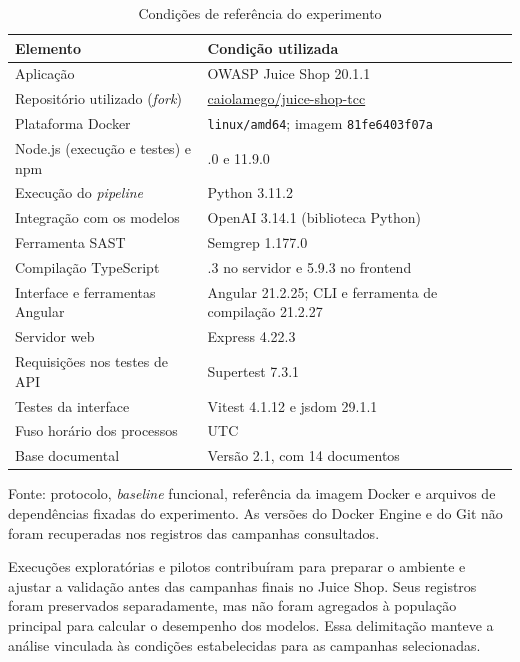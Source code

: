 \begin{table}[H]
\centering
\caption{Condições de referência do experimento}
\label{tab:condicoes}
\renewcommand{\arraystretch}{1.35}
\begin{tabularx}{\textwidth}{|>{\raggedright\arraybackslash}p{}|>{\raggedright\arraybackslash}X|}
\hline
\textbf{Elemento} & \textbf{Condição utilizada} \\
\hline
Aplicação & OWASP Juice Shop 20.1.1 \\
\hline
Repositório utilizado (\textit{fork}) & \href{https://github.com/caiolamego/juice-shop-tcc}{caiolamego/juice-shop-tcc} \\
\hline
Plataforma Docker & \texttt{linux/amd64}; imagem \texttt{81fe6403f07a} \\
\hline
Node.js (execução e testes) e npm & 24.14.0 e 11.9.0 \\
\hline
Execução do \textit{pipeline} & Python 3.11.2 \\
\hline
Integração com os modelos & OpenAI 3.14.1 (biblioteca Python) \\
\hline
Ferramenta SAST & Semgrep 1.177.0 \\
\hline
Compilação TypeScript & 6.0.3 no servidor e 5.9.3 no frontend \\
\hline
Interface e ferramentas Angular & Angular 21.2.25; CLI e ferramenta de compilação 21.2.27 \\
\hline
Servidor web & Express 4.22.3 \\
\hline
Requisições nos testes de API & Supertest 7.3.1 \\
\hline
Testes da interface & Vitest 4.1.12 e jsdom 29.1.1 \\
\hline
Fuso horário dos processos & UTC \\
\hline
Base documental & Versão 2.1, com 14 documentos \\
\hline
\end{tabularx}

\vspace{0.2cm}
\begin{minipage}{\textwidth}
    \footnotesize
    Fonte: protocolo, \textit{baseline} funcional, referência da imagem Docker e arquivos de dependências fixadas do experimento. As versões do Docker Engine e do Git não foram recuperadas nos registros das campanhas consultados.
\end{minipage}
\end{table}

Execuções exploratórias e pilotos contribuíram para preparar o ambiente e ajustar a validação antes das campanhas finais no Juice Shop. Seus registros foram preservados separadamente, mas não foram agregados à população principal para calcular o desempenho dos modelos. Essa delimitação manteve a análise vinculada às condições estabelecidas para as campanhas selecionadas.

